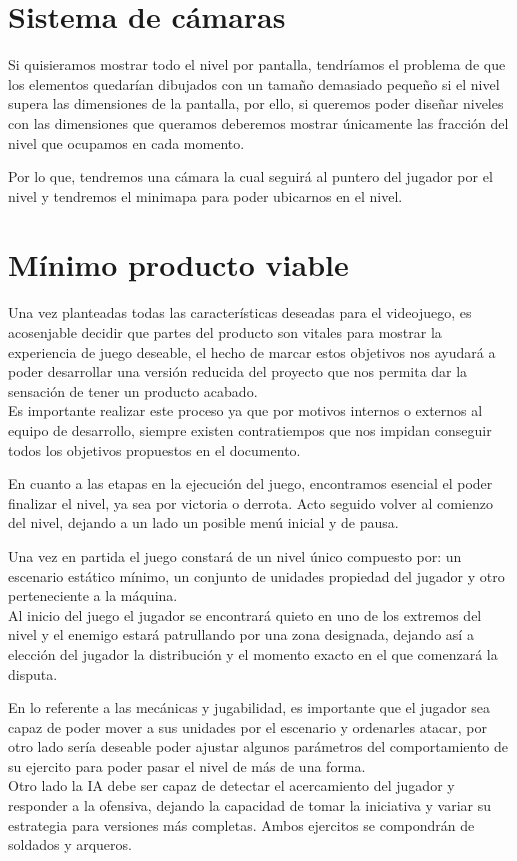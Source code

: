 \section{Sistema de cámaras}
Si quisieramos mostrar todo el nivel por pantalla, tendríamos el problema de que los elementos
quedarían dibujados con un tamaño demasiado pequeño si el nivel supera las dimensiones de la pantalla,
por ello, si queremos poder diseñar niveles con las dimensiones que queramos deberemos mostrar únicamente
las fracción del nivel que ocupamos en cada momento.

Por lo que, tendremos una cámara la cual seguirá al puntero del jugador por el nivel y tendremos el
minimapa para poder ubicarnos en el nivel.

\section{Mínimo producto viable}
Una vez planteadas todas las características deseadas para el videojuego, es acosenjable
decidir que partes del producto son vitales para mostrar la experiencia
de juego deseable, el hecho de marcar estos objetivos nos ayudará a poder desarrollar una
versión reducida del proyecto que nos permita dar la sensación de tener un producto acabado.\\
Es importante realizar este proceso ya que por motivos internos o externos al equipo de desarrollo,
siempre existen contratiempos que nos impidan conseguir todos los objetivos propuestos en el
documento.

En cuanto a las etapas en la ejecución del juego, encontramos esencial el poder finalizar el nivel,
ya sea por victoria o derrota. Acto seguido volver al comienzo del nivel, dejando a un lado un
posible menú inicial y de pausa.

Una vez en partida el juego constará de un nivel único compuesto por: un escenario estático
mínimo, un conjunto de unidades propiedad del jugador y otro perteneciente a la máquina.\\
Al inicio del juego el jugador se encontrará quieto en uno de los extremos del nivel y el enemigo 
estará patrullando por una zona designada, dejando así a elección del jugador la distribución y el
momento exacto en el que comenzará la disputa.

En lo referente a las mecánicas y jugabilidad, es importante que el jugador sea capaz de poder
mover a sus unidades por el escenario y ordenarles atacar, por otro lado sería deseable poder
ajustar algunos parámetros del comportamiento de su ejercito para poder pasar el nivel de más
de una forma.\\
Otro lado la \ac{IA} debe ser capaz de detectar el acercamiento del jugador y responder a la
ofensiva, dejando la capacidad de tomar la iniciativa y variar su estrategia para versiones
más completas. Ambos ejercitos se compondrán de soldados y arqueros.

